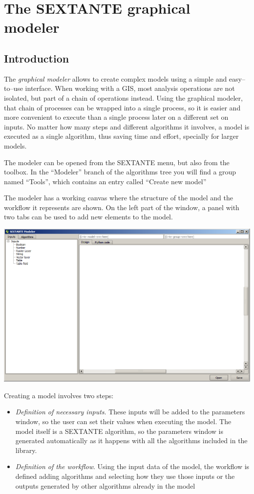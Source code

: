 \chapter{The SEXTANTE graphical modeler}

\section{Introduction}

The \emph{graphical modeler} allows to create complex models using a simple and easy--to--use interface. When working with a GIS, most analysis operations are not isolated, but part of a chain of operations instead. Using the graphical modeler, that chain of processes can be wrapped into a single process, so it is easier and more convenient to execute than a single process later on a different set on inputs. No matter how many steps and different algorithms it involves, a model is executed as a single algorithm, thus saving time and effort, specially for larger models.

The modeler can be opened from the SEXTANTE menu, but also from the toolbox. In the ``Modeler'' branch of the algorithms tree you will find a group named ``Tools'', which contains an entry called ``Create new model''

The modeler has a working canvas where the structure of the model and the workflow it represents are shown. On the left part of the window, a panel with two tabs can be used to add new elements to the model.

\begin{center}
\includegraphics[width=.8\columnwidth]{modeler_canvas.png}
\end{center}

Creating a model involves two steps:

\begin{itemize}
	\item \emph{Definition of necessary inputs}. These inputs will be added to the parameters window, so the user can set their values when executing the model. The model itself is a SEXTANTE algorithm, so the parameters window is generated automatically as it happens with all the algorithms included in the library.
	\item \emph{Definition of the workflow}. Using the input data of the model, the workflow is defined adding algorithms and selecting how they use those inputs or the outputs generated by other algorithms already in the model 
\end{itemize}


